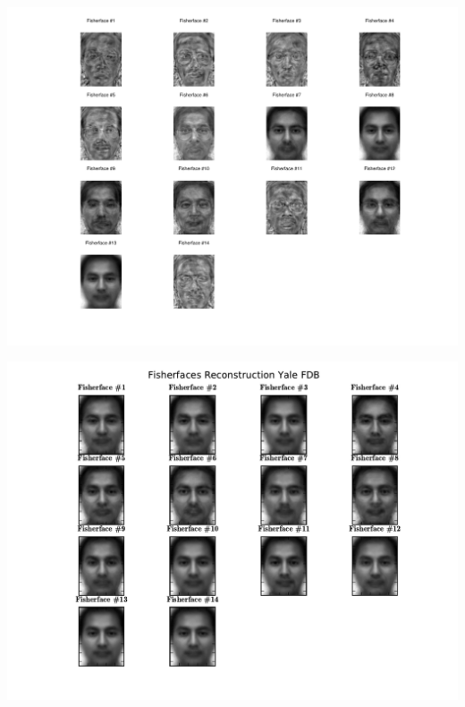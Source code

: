 \ifx\python\undefined
	
\else
	
\fi


\ifx\python\undefined
	\begin{center}
		\includegraphics[scale=0.6]{img/fisherfaces/octave_fisherfaces_reconstruction}
	\end{center}
\else
	\begin{center}
		\includegraphics[scale=0.6]{img/fisherfaces/python_fisherfaces_reconstruction}
	\end{center}
\fi

